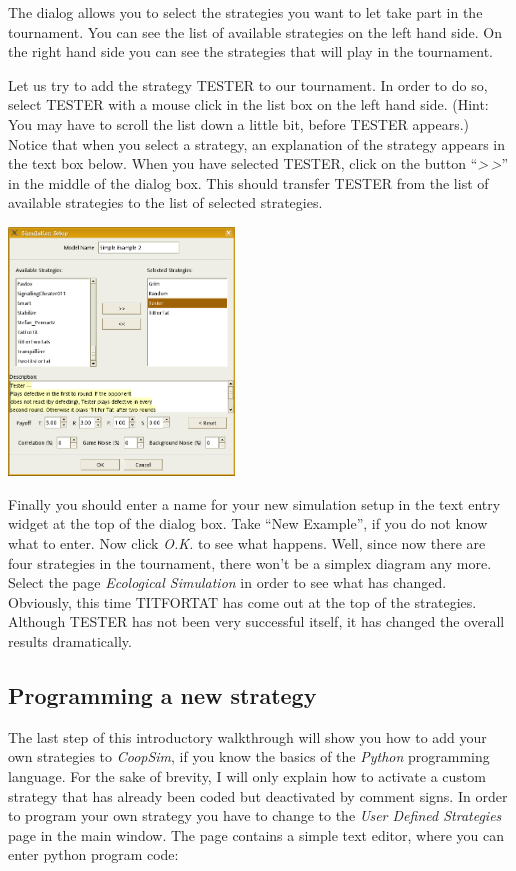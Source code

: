 \documentclass[12pt,a4paper,USenglish]{article}
\begin{document}
The dialog allows you to select the strategies you want to let take
part in the tournament. You can see the list of available strategies
on the left hand side. On the right hand side you can see the strategies
that will play in the tournament. 

Let us try to add the strategy TESTER to our tournament. In order to
do so, select TESTER with a mouse click in the list box on the left
hand side. (Hint: You may have to scroll the list down a little bit,
before TESTER appears.) Notice that when you select a strategy, an
explanation of the strategy appears in the text box below. When you
have selected TESTER, click on the button ``\emph{>\,>}'' in the middle of
the dialog box. This should transfer TESTER from the list of available
strategies to the list of selected strategies.

\begin{center}
\includegraphics[width=6cm,keepaspectratio]{big_images/new_dialog2.png}
\end{center}

Finally you should enter a name for your new simulation setup in the
text entry widget at the top of the dialog box. Take ``New Example'',
if you do not know what to enter. Now click \emph{O.K.} to see what
happens. Well, since now there are four strategies in the tournament,
there won't be a simplex diagram any more. Select the page \emph{Ecological
Simulation} in order to see what has changed. Obviously, this time
TITFORTAT has come out at the top of the strategies. Although TESTER
has not been very successful itself, it has changed the overall results
dramatically.


\subsection{Programming a new strategy}

The last step of this introductory walkthrough will show you how
to add your own strategies to \emph{CoopSim}, if you know the basics
of the \emph{Python} programming language. For the sake of brevity,
I will only explain how to activate a custom strategy that has already
been coded but deactivated by comment signs. In order to program your
own strategy you have to change to the \emph{User Defined Strategies}
page in the main window. The page contains a simple text editor, where
you can enter python program code:
\end{document}
